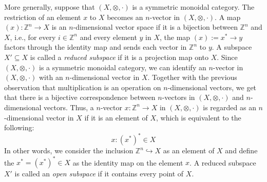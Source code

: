\documentclass[a4paper,reqno,oneside]{article}
\begin{document}
More generally, suppose that $(X,\otimes,\cdot)$ is a symmetric monoidal category. The restriction of an element $x$ to $X$ becomes an $n$-vector in $(X,\otimes,\cdot)$. A map $(x):\mathbb{Z}^{n}\to X$ is an $n$-dimensional vector space if it is a bijection between $\mathbb{Z}^n$ and $X$, i.e., for every $i\in \mathbb{Z}^n$ and every element $y$ in $X$, the map $(x):=x^*\to y$ factors through the identity map and sends each vector in $\mathbb{Z}^n$ to $y$. A subspace $X'\subseteq X$ is called a \emph{reduced subspace} if it is a projection map onto $X$. Since $(X,\otimes,\cdot)$ is a symmetric monoidal category, we can identify an $n$-vector in $(X,\otimes,\cdot)$ with an $n$-dimensional vector in $X$. Together with the previous observation that multiplication is an operation on $n$-dimensional vectors, we get that there is a bijective correspondence between $n$-vectors in $(X,\otimes,\cdot)$ and $n$-dimensional vectors. Thus, a $n$-vector $x:\mathbb{Z}^n\to X$ in $(X,\otimes,\cdot)$ is regarded as an $n$-dimensional vector in $X$ if it is an element of $X$, which is equivalent to the following:
$$ x:(x^*)^*\in X$$
In other words, we consider the inclusion $\mathbb{Z}^n\hookrightarrow X$ as an element of $X$ and define the $x^*=\left(x^*\right)^*\in X$ as the identity map on the element $x$.  A reduced subspace $X'$ is called an \emph{open subspace} if it contains every point of $X$. 
\end{document}
